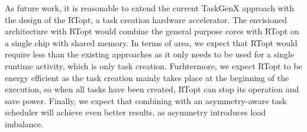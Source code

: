 As future work, it is reasonable to extend the current TaskGenX approach with the design of the RTopt, a task creation hardware accelerator.
The envisioned architecture with RTopt would combine the general purpose cores with RTopt on a single chip with shared memory.
In terms of area, we expect that RTopt would require less than the existing approaches as it only needs to be used for a single runtime activity, which is only task creation.
Furhtermore, we expect RTopt to be energy efficient as the task creation mainly takes place at the beginning of the execution, so when all tasks have been created, RTopt can stop its operation and save power.
Finally, we expect that combining {\proposal} with an asymmetry-aware task scheduler will achieve even better results, as asymmetry introduces load imbalance.


